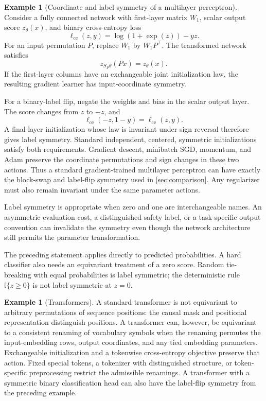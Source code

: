 \documentclass[11pt,twoside]{article}
\newcommand{\I}{\mathbb I}
\theoremstyle{definition}
\newtheorem{example}[theorem]{Example}
\theoremstyle{remark}
\begin{document}
\begin{example}[Coordinate and label symmetry of a multilayer perceptron]
Consider a fully connected network with first-layer matrix \(W_1\), scalar
output score \(z_\theta(x)\), and binary cross-entropy loss
\begin{equation}
 \ell_{\mathrm{ce}}(z,y)=\log(1+\exp(z))-yz.
 \label{eq:binary-cross-entropy}
\end{equation}
For an input permutation \(P\), replace \(W_1\) by \(W_1P^\top\). The
transformed network satisfies
\[
 z_{S_P\theta}(Px)=z_\theta(x).
\]
If the first-layer columns have an exchangeable joint initialization law, the
resulting gradient learner has input-coordinate symmetry.

For a binary-label flip, negate the weights and bias in the scalar output
layer. The score changes from \(z\) to \(-z\), and
\begin{equation}
 \ell_{\mathrm{ce}}(-z,1-y)=\ell_{\mathrm{ce}}(z,y).
 \label{eq:cross-entropy-label-flip}
\end{equation}
A final-layer initialization whose law is invariant under sign reversal
therefore gives label symmetry. Standard independent, centered, symmetric
initializations satisfy both requirements. Gradient descent, minibatch SGD,
momentum, and Adam preserve the coordinate permutations and sign changes in
these two actions. Thus a standard gradient-trained multilayer perceptron can
have exactly the block-swap and label-flip symmetry used in
\cref{sec:comparison}. Any regularizer must also remain invariant under the
same parameter actions.

Label symmetry is appropriate when zero and one are interchangeable names.
An asymmetric evaluation cost, a distinguished safety label, or a
task-specific output convention can invalidate the symmetry even though the
network architecture still permits the parameter transformation.

The preceding statement applies directly to predicted probabilities. A hard
classifier also needs an equivariant treatment of a zero score. Random
tie-breaking with equal probabilities is label symmetric; the deterministic
rule \(\I\{z\ge0\}\) is not label symmetric at \(z=0\).
\end{example}

\begin{example}[Transformers]
A standard transformer is not equivariant to arbitrary permutations of
sequence positions: the causal mask and positional representation distinguish
positions. A transformer can, however, be equivariant to a consistent
renaming of vocabulary symbols when the renaming permutes the input-embedding
rows, output coordinates, and any tied embedding parameters. Exchangeable
initialization and a tokenwise cross-entropy objective preserve that action.
Fixed special tokens, a tokenizer with distinguished structure, or
token-specific preprocessing restrict the admissible renamings. A transformer
with a symmetric binary classification head can also have the label-flip
symmetry from the preceding example.
\end{example}
\end{document}
